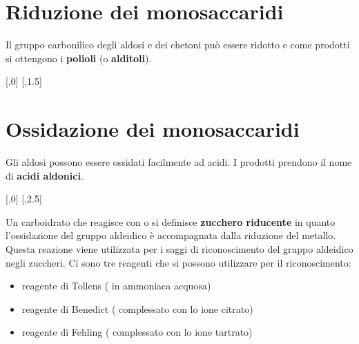 \section{Riduzione dei monosaccaridi}
Il gruppo carbonilico degli aldosi e dei chetoni può essere ridotto e come prodotti si ottengono i \textbf{polioli} (o \textbf{alditoli}).
\begin{reaction}
	[,0]
	\arrow
	\arrow{->[1. \ch{NaBH4}][2. \ch{H2O}]}[,1.5]
\end{reaction}


\section{Ossidazione dei monosaccaridi}
Gli aldosi possono essere ossidati facilmente ad acidi. I prodotti prendono il nome di \textbf{acidi aldonici}.

\begin{reaction}
	[,0]
	\arrow{->[\ch{Br2}, \ch{H2O}][oppure \ch[circled=formal]{Ag+} o \ch[circled=formal]{Cu^{2+}}]}[,2.5]
\end{reaction}

Un carboidrato che reagisce con  o  si definisce \textbf{zucchero riducente} in quanto l'ossidazione del gruppo aldeidico è accompagnata dalla riduzione del metallo. Questa reazione viene utilizzata per i saggi di riconoscimento del gruppo aldeidico negli zuccheri. Ci sono tre reagenti che si possono utilizzare per il riconoscimento:
\begin{itemize}
	\item reagente di Tollens ( in ammoniaca acquosa)
	\item reagente di Benedict ( complessato con lo ione citrato)
	\item reagente di Fehling ( complessato con lo ione tartrato)
\end{itemize}

